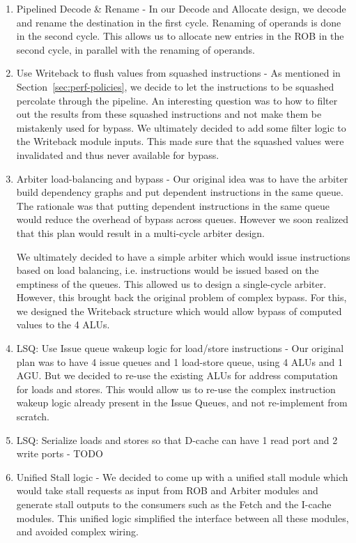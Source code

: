 \documentclass{article}
\begin{document}
\begin{enumerate}
	\item Pipelined Decode \& Rename - In our Decode and Allocate design,
	we decode and rename the destination in the first cycle.  Renaming of
	operands is done in the second cycle. This allows us to allocate new
	entries in the ROB in the second cycle, in parallel with the renaming
	of operands.

	\item Use Writeback to flush values from squashed instructions - As
	mentioned in Section~\ref{sec:perf-policies}, we decide to let the
	instructions to be squashed percolate through the pipeline.  An
	interesting question was to how to filter out the results from these
	squashed instructions and not make them be mistakenly used for bypass.
	We ultimately decided to add some filter logic to the Writeback module
	inputs. This made sure that the squashed values were invalidated and
	thus never available for bypass.

	\item Arbiter load-balancing and bypass - Our original idea was to have
	the arbiter build dependency graphs and put dependent instructions in
	the same queue. The rationale was that putting dependent instructions
	in the same queue would reduce the overhead of bypass across queues.
	However we soon realized that this plan would result in a multi-cycle
	arbiter design.

	We ultimately decided to have a simple arbiter which would issue
	instructions based on load balancing, i.e. instructions would be issued
	based on the emptiness of the queues. This allowed us to design a
	single-cycle arbiter. However, this brought back the original problem
	of complex bypass. For this, we designed the Writeback structure which
	would allow bypass of computed values to the 4 ALUs.

	\item LSQ: Use Issue queue wakeup logic for load/store instructions -
	Our original plan was to have 4 issue queues and 1 load-store queue,
	using 4 ALUs and 1 AGU. But we decided to re-use the existing ALUs for
	address computation for loads and stores.  This would allow us to
	re-use the complex instruction wakeup logic already present in the
	Issue Queues, and not re-implement from scratch.

	\item LSQ: Serialize loads and stores so that D-cache can have 1 read
	port and 2 write ports - TODO

	\item Unified Stall logic - We decided to come up with a unified stall
	module which would take stall requests as input from ROB and Arbiter
	modules and generate stall outputs to the consumers such as the Fetch
	and the I-cache modules. This unified logic simplified the interface
	between all these modules, and avoided complex wiring.
\end{enumerate}
\end{document}

